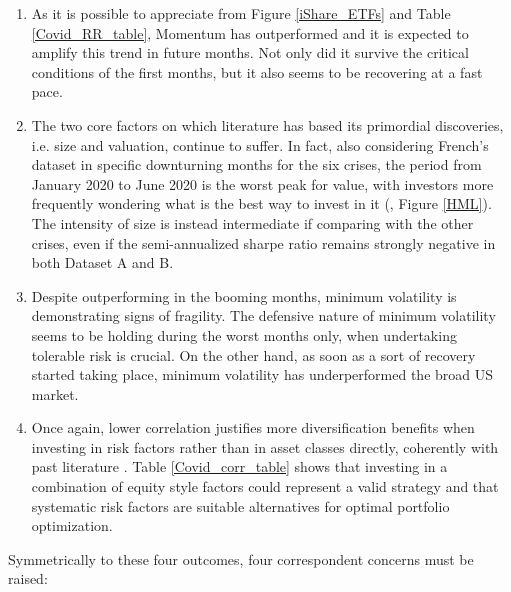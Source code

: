 \documentclass[12pt]{article}
\begin{document}
\begin{enumerate}
\item As it is possible to appreciate from Figure \ref{iShare_ETFs} and Table \ref{Covid_RR_table}, Momentum has outperformed and it is expected to amplify this trend in future months. Not only did it survive the critical conditions of the first months, but it also seems to be recovering at a fast pace.
\item The two core factors on which literature has based its primordial discoveries, i.e. size and valuation, continue to suffer. In fact, also considering French's dataset in specific downturning months for the six crises, the period from January 2020 to June 2020 is the worst peak for value, with investors more frequently wondering what is the best way to invest in it (, Figure \ref{HML}). The intensity of size is instead intermediate if comparing with the other crises, even if the semi-annualized sharpe ratio remains strongly negative in both Dataset A and B.
\item Despite outperforming in the booming months, minimum volatility is demonstrating signs of fragility. The defensive nature of minimum volatility seems to be holding during the worst months only, when undertaking tolerable risk is crucial. On the other hand, as soon as a sort of recovery started taking place, minimum volatility has underperformed the broad US market.
\item Once again, lower correlation justifies more diversification benefits when investing in risk factors rather than in asset classes directly, coherently with past literature \cite{clarke2005factor}. Table \ref{Covid_corr_table} shows that investing in a combination of equity style factors could represent a valid strategy and that systematic risk factors are suitable alternatives for optimal portfolio optimization.
\end{enumerate}

Symmetrically to these four outcomes, four correspondent concerns must be raised:
\end{document}
